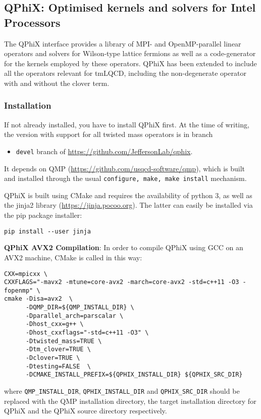 
\subsection{QPhiX: Optimised kernels and solvers for Intel Processors}\label{subsec:qphix}


The QPhiX \cite{Joo2013} interface provides a library of MPI- and OpenMP-parallel linear operators and solvers for Wilson-type lattice fermions as well as a code-generator for the kernels employed by these operators.
QPhiX has been extended to include all the operators relevant for tmLQCD, including the non-degenerate operator with and without the clover term.

\subsubsection{Installation}
If not already installed, you have to install QPhiX first.
At the time of writing, the version with support for all twisted mass operators is in branch 

\begin{itemize}
\item{\texttt{devel} branch of \url{https://github.com/JeffersonLab/qphix}.}
\end{itemize}

It depends on QMP (\url{https://github.com/usqcd-software/qmp}), which is built and installed through the usual \texttt{configure, make, make install} mechanism.

QPhiX is built using CMake and requires the availability of python 3, as well as the jinja2 library (\url{https://jinja.pocoo.org}).
The latter can easily be installed via the pip package installer:
\begin{framed}
\begin{Verbatim}
pip install --user jinja  
\end{Verbatim}
\end{framed}

\textbf{QPhiX AVX2 Compilation}: 
In order to compile QPhiX using GCC on an AVX2 machine, CMake is called in this way:
\begin{framed}
\begin{Verbatim}[fontsize=\small]
CXX=mpicxx \
CXXFLAGS="-mavx2 -mtune=core-avx2 -march=core-avx2 -std=c++11 -O3 -fopenmp" \
cmake -Disa=avx2  \
      -DQMP_DIR=${QMP_INSTALL_DIR} \
      -Dparallel_arch=parscalar \
      -Dhost_cxx=g++ \
      -Dhost_cxxflags="-std=c++11 -O3" \
      -Dtwisted_mass=TRUE \
      -Dtm_clover=TRUE \
      -Dclover=TRUE \
      -Dtesting=FALSE  \
      -DCMAKE_INSTALL_PREFIX=${QPHIX_INSTALL_DIR} ${QPHIX_SRC_DIR}
\end{Verbatim}
\end{framed}
where \texttt{QMP\_INSTALL\_DIR}, \texttt{QPHIX\_INSTALL\_DIR} and \texttt{QPHIX\_SRC\_DIR} should be replaced with the QMP installation directory, the target installation directory for QPhiX and the QPhiX source directory respectively.

